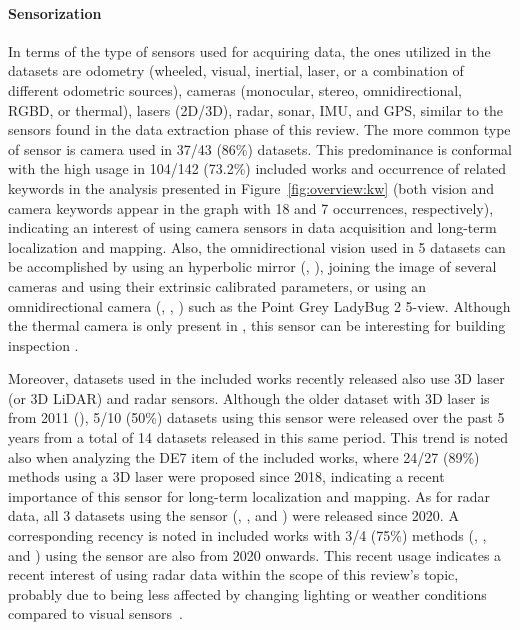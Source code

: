 \paragraph{Sensorization}

In terms of the type of sensors used for acquiring data, the ones utilized in the datasets are odometry (wheeled, visual, inertial, laser, or a combination of different odometric sources), cameras (monocular, stereo, omnidirectional, RGBD, or thermal), lasers (2D/3D), radar, sonar, IMU, and GPS, similar to the sensors found in the data extraction phase of this review. The more common type of sensor is camera used in 37/43 (86\%) datasets. This predominance is conformal with the high usage in 104/142 (73.2\%) included works and occurrence of related keywords in the analysis presented in Figure~\ref{fig:overview:kw} (both vision and camera keywords appear in the graph with 18 and 7 occurrences, respectively), indicating an interest of using camera sensors in data acquisition and long-term localization and mapping.
Also, the omnidirectional vision used in 5 datasets can be accomplished by using an hyperbolic mirror (, ), joining the image of several cameras and using their extrinsic calibrated parameters, or using an omnidirectional camera (, , ) such as the Point Grey LadyBug 2 5-view.
Although the thermal camera is only present in , this sensor can be interesting for building inspection \parencite{yue-et-al:2020:9197072}.

Moreover, datasets used in the included works recently released also use 3D laser (or 3D LiDAR) and radar sensors. Although the older dataset with 3D laser is from 2011 (), 5/10 (50\%) datasets using this sensor were released over the past 5 years from a total of 14 datasets released in this same period. This trend is noted also when analyzing the DE7 item of the included works, where 24/27 (89\%) methods using a 3D laser were proposed since 2018, indicating a recent importance of this sensor for long-term localization and mapping.
As for radar data, all 3 datasets using the sensor (, , and ) were released since 2020. A corresponding recency is noted in included works with 3/4 (75\%) methods (\cite{martini-et-al:2020:s20216002}, \cite{yin-et-al:2021:661199}, and \cite{hong-et-al:2022:02783649221080483}) using the sensor are also from 2020 onwards. This recent usage indicates a recent interest of using radar data within the scope of this review's topic, probably due to being less affected by changing lighting or weather conditions compared to visual sensors~\parencite{hong-et-al:2022:02783649221080483}.

